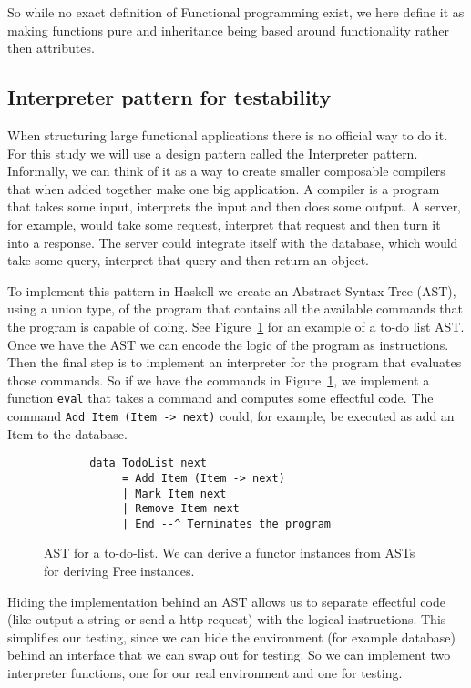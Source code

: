 \documentclass[12pt]{report}
\theoremstyle{definition}
\theoremstyle{theorem}
\begin{document}
So while no exact definition of Functional programming exist, we here define it
as making functions pure and inheritance being based around functionality rather
then attributes.

\subsection{Interpreter pattern for testability}

When structuring large functional applications there is no official way to do
it. For this study we will use a design pattern called the Interpreter pattern.
Informally, we can think of it as a way to create smaller composable compilers
that when added together make one big application. A compiler is a program that
takes some input, interprets the input and then does some output. A server, for
example, would take some request, interpret that request and then turn it into a
response. The server could integrate itself with the database, which would take
some query, interpret that query and then return an
object.~\cite{interpreterpattern}

To implement this pattern in Haskell we create an Abstract Syntax Tree (AST),
using a union type, of the program that contains all the available commands that
the program is capable of doing. See Figure~\ref{freeunion} for an example of a
to-do list AST. Once we have the AST we can encode the logic of the program as
instructions. Then the final step is to implement an interpreter for the program
that evaluates those commands. So if we have the commands in
Figure~\ref{freeunion}, we implement a function \texttt{eval} that takes a
command and computes some effectful code. The command \texttt{Add Item (Item ->
next)} could, for example, be executed as add an Item to the database.

\begin{figure}[H]
    \begin{lstlisting}
       data TodoList next
            = Add Item (Item -> next)
            | Mark Item next
            | Remove Item next
            | End --^ Terminates the program
    \end{lstlisting}
    \label{freeunion}
    \caption{AST for a to-do-list. We can derive a functor instances
    from ASTs for deriving Free instances.~\cite{commentarycompiler}}
\end{figure}


Hiding the implementation behind an AST allows us to separate effectful code
(like output a string or send a http request) with the logical instructions.
This simplifies our testing, since we can hide the environment (for example
database) behind an interface that we can swap out for testing. So we can
implement two interpreter functions, one for our real environment and one for
testing. 
\end{document}
